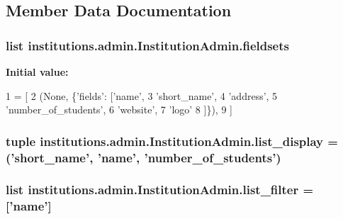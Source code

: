 \subsection{Member Data Documentation}
\hypertarget{classinstitutions_1_1admin_1_1_institution_admin_a5ed5136c42c55990a316c065557d9aa0}{
\subsubsection[{fieldsets}]{\setlength{\rightskip}{0pt plus 5cm}list institutions.\-admin.\-Institution\-Admin.\-fieldsets\hspace{0.3cm}{\ttfamily [static]}}}\label{classinstitutions_1_1admin_1_1_institution_admin_a5ed5136c42c55990a316c065557d9aa0}
{\bfseries Initial value\-:}
\begin{DoxyCode}
1 = [
2         (\textcolor{keywordtype}{None}, \{\textcolor{stringliteral}{'fields'}: [\textcolor{stringliteral}{'name'},
3                            \textcolor{stringliteral}{'short\_name'},
4                            \textcolor{stringliteral}{'address'},
5                            \textcolor{stringliteral}{'number\_of\_students'},
6                            \textcolor{stringliteral}{'website'},
7                            \textcolor{stringliteral}{'logo'}
8         ]\}),
9     ]
\end{DoxyCode}
\hypertarget{classinstitutions_1_1admin_1_1_institution_admin_a70f957c33592da810f9f9317d8cc13ad}{
\subsubsection[{list\-\_\-display}]{\setlength{\rightskip}{0pt plus 5cm}tuple institutions.\-admin.\-Institution\-Admin.\-list\-\_\-display = ('short\-\_\-name', 'name', 'number\-\_\-of\-\_\-students')\hspace{0.3cm}{\ttfamily [static]}}}\label{classinstitutions_1_1admin_1_1_institution_admin_a70f957c33592da810f9f9317d8cc13ad}
\hypertarget{classinstitutions_1_1admin_1_1_institution_admin_a60e733a2e3a09bdcf381fb1ad1146100}{
\subsubsection[{list\-\_\-filter}]{\setlength{\rightskip}{0pt plus 5cm}list institutions.\-admin.\-Institution\-Admin.\-list\-\_\-filter = \mbox{[}'name'\mbox{]}\hspace{0.3cm}{\ttfamily [static]}}}\label{classinstitutions_1_1admin_1_1_institution_admin_a60e733a2e3a09bdcf381fb1ad1146100}
